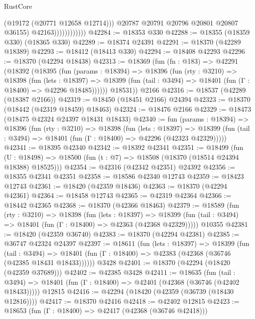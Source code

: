 \begin{lexlean}{RustCore}
\begin{coremodule}
                                (@19172 (@20771 @12658 @12714)))
                              @20787
                              @20791
                              @20796
                              @20801
                              @20807
                              @36155)
                            @42163))))))))))))
@42284 := @18353 @330
@42288 := @18355 (@18359 @330) (@18365 @330)
@42289 := @18374 @24391
@42291 := @18370 (@42289 @18389)
@42293 := @18412 (@18413 @330)
@42294 := @18408 @42293
@42296 := @18370 (@42294 @18438)
@42313 := @18369
    (fun (fn : @183) =>
    @42291
      (@18392
        (@18395
          (fun (params : @18394) =>
          @18396
            (fun (rty : @3210) =>
            @18398
              (fun (lets : @18397) =>
              @18399 (fun (tail : @3494) => @18401 (fun (Γ : @18400) => @42296 @18485))))))
        @18531))
    @2166
@42316 := @18537 (@42289 (@18387 @2166))
@42319 := @18450 (@18451 @2166) @24394
@42323 := @18370 (@18442 (@42319 @18459) @18463)
@42324 := @18476 @2166
@42329 := @18473 (@18475 @42324 @24397 @18431 @18433)
@42340 := fun (params : @18394) =>
  @18396
    (fun (rty : @3210) =>
    @18398
      (fun (lets : @18397) =>
      @18399 (fun (tail : @3494) => @18401 (fun (Γ : @18400) => @42296 (@42323 @42329)))))
@42341 := @18395 @42340
@42342 := @18392 @42341
@42351 := @18499
    (fun (U : @18498) => @18500 (fun (t : @7) => @18508 (@18370 (@18514 @24394 @18388) @18525)))
@42354 := @42316 (@42342 @42351) @24392
@42356 := @18355 @42341 @42351
@42358 := @18586 @42340 @12743
@42359 := @18423 @12743
@42361 := @18420 (@42359 @18436)
@42363 := @18370 (@42294 @42361)
@42364 := @18458 @12743
@42365 := @42319 @42364
@42366 := @18442 @42365
@42368 := @18370 (@42366 @18463)
@42379 := @18589
    (fun (rty : @3210) =>
    @18398
      (fun (lets : @18397) =>
      @18399 (fun (tail : @3494) => @18401 (fun (Γ : @18400) => @42363 (@42368 @42329)))))
    @10355
@42381 := @18420 (@42359 @36740)
@42383 := @18370 (@42294 @42381)
@42385 := @36747 @42324 @24397
@42397 := @18611
    (fun (lets : @18397) =>
    @18399
      (fun (tail : @3494) =>
      @18401 (fun (Γ : @18400) => @42383 (@42368 (@36746 (@42385 @18431 @18433))))))
    @3428
@42401 := @18370 (@42294 (@18420 (@42359 @37689)))
@42402 := @42385 @3428
@42411 := @18635
    (fun (tail : @3494) => @18401 (fun (Γ : @18400) => @42401 (@42368 (@36746 (@42402 @18433)))))
    @12815
@42416 := @42294 (@18420 (@42359 (@36739 (@18430 @12816))))
@42417 := @18370 @42416
@42418 := @42402 @12815
@42423 := @18653 (fun (Γ : @18400) => @42417 (@42368 (@36746 @42418)))

\end{coremodule}
\end{lexlean}
